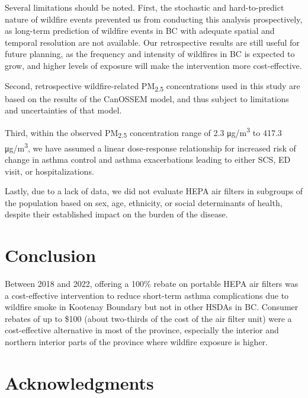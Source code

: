 \documentclass[
  number]{elsarticle}
\begin{document}
Several limitations should be noted. First, the stochastic and
hard-to-predict nature of wildfire events prevented us from conducting
this analysis prospectively, as long-term prediction of wildfire events
in BC with adequate spatial and temporal resolution are not available.
Our retrospective results are still useful for future planning, as the
frequency and intensity of wildfires in BC is expected to grow, and
higher levels of exposure will make the intervention more
cost-effective.

Second, retrospective wildfire-related PM\textsubscript{2.5}
concentrations used in this study are based on the results of the
CanOSSEM model, and thus subject to limitations and uncertainties of
that model.

Third, within the observed PM\textsubscript{2.5} concentration range of
2.3 μg/m\textsuperscript{3} to 417.3 μg/m\textsuperscript{3}, we have
assumed a linear dose-response relationship for increased risk of change
in asthma control and asthma exacerbations leading to either SCS, ED
visit, or hospitalizations.

Lastly, due to a lack of data, we did not evaluate HEPA air filters in
subgroups of the population based on sex, age, ethnicity, or social
determinants of health, despite their established impact on the burden
of the disease\citep{chowdhury2021, schröder2015, karunanayake2020}.

\hypertarget{conclusion}{%
\section{Conclusion}\label{conclusion}}

Between 2018 and 2022, offering a 100\% rebate on portable HEPA air
filters was a cost-effective intervention to reduce short-term asthma
complications due to wildfire smoke in Kootenay Boundary but not in
other HSDAs in BC. Consumer rebates of up to \$100 (about two-thirds of
the cost of the air filter unit) were a cost-effective alternative in
most of the province, especially the interior and northern interior
parts of the province where wildfire exposure is higher.

\hypertarget{acknowledgments}{%
\section{Acknowledgments}\label{acknowledgments}}
\end{document}
